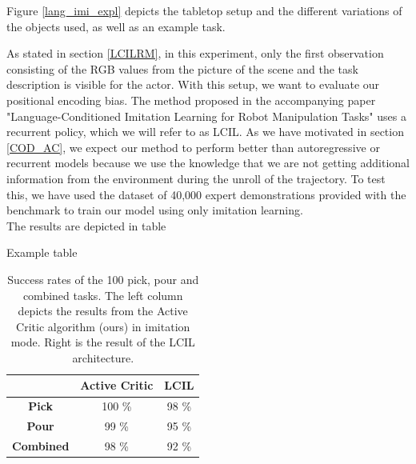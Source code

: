 Figure \ref{lang_imi_expl} depicts the tabletop setup and the different variations of the objects used, as well as an example task.

As stated in section \ref{LCILRM}, in this experiment, only the first observation consisting of the RGB values from the picture of the 
scene and the task description is visible for the actor. With this setup, we want to evaluate our positional encoding bias. The method 
proposed in the accompanying paper "Language-Conditioned Imitation Learning for Robot Manipulation Tasks" uses a recurrent policy, which 
we will refer to as LCIL. As we have motivated in section \ref{COD_AC}, we expect our method to perform better than autoregressive or recurrent 
models because we use the knowledge that we are not getting additional information from the environment during the unroll of the trajectory. 
To test this, we have used the dataset of 40,000 expert demonstrations provided with the benchmark to train our model using only imitation learning.\\

The results are depicted in table

\begin{table}
    \centering
    \caption{Example table}
    \begin{tabular}{|c|c|c|}
        \cline{2-3}
        \multicolumn{1}{c|}{} & \textbf{Active Critic} & \textbf{LCIL} \\ \hline
        \textbf{Pick} & 100 \% & 98 \% \\ \hline
        \textbf{Pour} & 99 \% & 95 \% \\ \hline
        \textbf{Combined} & 98 \% & 92 \% \\ \hline
    \end{tabular}
    \caption{Success rates of the 100 pick, pour and combined tasks. The left column depicts the results from the Active Critic algorithm (ours) in 
    imitation mode. Right is the result of the LCIL architecture.}
\end{table}

